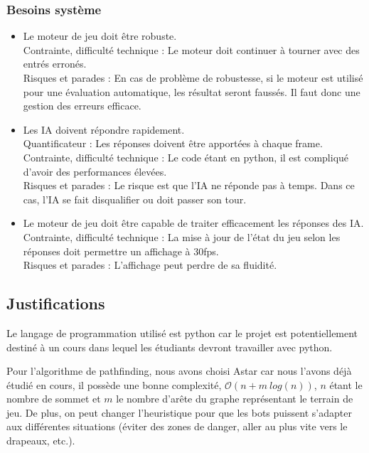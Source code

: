 \documentclass[french]{article}
\begin{document}
\subsubsection{Besoins système}
    \begin{itemize}
        \item Le moteur de jeu doit être robuste. \\
            Contrainte, difficulté technique : Le moteur doit continuer à tourner avec des entrés erronés. \\
            Risques et parades : En cas de problème de robustesse, si le moteur est utilisé pour une évaluation automatique, les résultat seront faussés. Il faut donc une gestion des erreurs efficace.\\

        \item Les IA doivent répondre rapidement.\\
            Quantificateur : Les réponses doivent être apportées à chaque frame.\\
            Contrainte, difficulté technique : Le code étant en python, il est compliqué d'avoir des performances élevées.\\
            Risques et parades : Le risque est que l'IA ne réponde pas à temps. Dans ce cas, l'IA se fait disqualifier ou doit passer son tour.\\
        
        \item Le moteur de jeu doit être capable de traiter efficacement les réponses des IA.\\
            Contrainte, difficulté technique :  La mise à jour de l'état du jeu selon les réponses doit permettre un affichage à 30fps.\\
            Risques et parades : L'affichage peut perdre de sa fluidité.\\
        
    \end{itemize}

\subsection{Justifications}
Le langage de programmation utilisé est python car le projet est potentiellement destiné à un cours dans lequel les étudiants devront travailler avec python. \newline

Pour l'algorithme de pathfinding, nous avons choisi Astar car nous l'avons déjà étudié en cours, il possède une bonne complexité, $\mathcal{O}(n + m\ log(n))$, $n$ étant le nombre de sommet et $m$ le nombre d'arête du graphe représentant le terrain de jeu. De plus, on peut changer l'heuristique pour que les bots puissent s'adapter aux différentes situations (éviter des zones de danger, aller au plus vite vers le drapeaux, etc.). \newline
\end{document}
